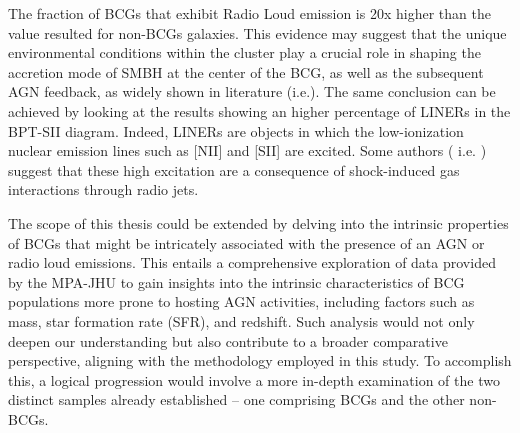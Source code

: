 The fraction of BCGs that exhibit Radio Loud emission is 20x higher than the value resulted for non-BCGs galaxies.
This evidence may suggest that the unique environmental conditions within the cluster play a crucial role in shaping the accretion mode of SMBH at the center of the BCG, as well as the subsequent AGN feedback, as widely shown in literature (i.e.\cite{2019ApJ...883..193N, 2021A&A...649A..23C}).
The same conclusion can be achieved by looking at the results showing an higher percentage of LINERs in the BPT-SII diagram. Indeed, LINERs are objects in which the low-ionization nuclear emission lines such as [NII] and [SII] are excited. Some authors ( i.e. \cite{Fabbiano_2022}) suggest that these high excitation are a consequence of shock-induced gas interactions through radio jets.

The scope of this thesis could be extended by delving into the intrinsic properties of BCGs that might be intricately associated with the presence of an AGN or radio loud emissions. This entails a comprehensive exploration of data provided by the MPA-JHU to gain insights into the intrinsic characteristics of BCG populations more prone to hosting AGN activities, including factors such as mass, star formation rate (SFR), and redshift. Such analysis would not only deepen our understanding but also contribute to a broader comparative perspective, aligning with the methodology employed in this study. To accomplish this, a logical progression would involve a more in-depth examination of the two distinct samples already established – one comprising BCGs and the other non-BCGs.

\begin{comment}
Lascio a te scrivere per bene la parte di prospettive future su questa linea di ricerca. Io qui ti faccio un discorsetto in italiano, tu riportalo per bene a modo tuo.
Ora abbiamo visto se le BCG hanno una significativa differenza in frazione di AGN rispetto alle non BCG giusto? E al momento quello che possiamo fare è semplicemente ipotizzare che queste differenze siano guidate dai differenti processi evolutivi delle BCG, a loro volta come conseguenza del fatto che queste si trovano alcentro di overdensity, in cui gas accretion dal cosmic web e merger activity sono all’ordine del giorno. 

Tuttavia sarebbe interessante capire se ci sono proprietà specifiche di queste BCG, che sono correlate con la presenza di un AGN o di un’emissione radio.  Per fare ciò abbiamo altre proprietà derivate dal team XX (gli stessi che ti danno i redshifts e le emissioni in riga), che possono essere utilizzate per avere una view del tipo di proprietà che ha la popolazione più incline ad avere un attività di AGN (Massa, SFR, Z, sigma della riga). Quindi in futuro sarà importante investigare eventuali correlazioni, come già è stato fatto in altri lavori (cercateli), però in questo caso andiamo a studiare le correlazioni in funzione della selezione che abbiamo di BCG e non-BCG. (ps- questi subsamples sono in sè già una selezione in Massa e Environment, perché ovviamente le BCG saranno le galassie più massicce in regioni dense).
Detto ciò vedi quello che puoi scrivere.
Buona conclusione.
\end{comment}



